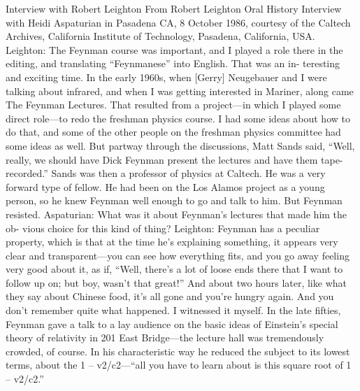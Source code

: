 \documentclass[11pt,oneside]{article}
\begin{document}
Interview with Robert Leighton From Robert Leighton Oral History Interview with Heidi Aspaturian in Pasadena CA, 8 October 1986, courtesy of the Caltech Archives, California Institute of Technology, Pasadena, California, USA. Leighton: The Feynman course was important, and I played a role there in the editing, and translating “Feynmanese” into English. That was an in- teresting and exciting time. In the early 1960s, when [Gerry] Neugebauer and I were talking about infrared, and when I was getting interested in Mariner, along came The Feynman Lectures. That resulted from a project---in which I played some direct role---to redo the freshman physics course. I had some ideas about how to do that, and some of the other people on the freshman physics committee had some ideas as well. But partway through the discussions, Matt Sands said, “Well, really, we should have Dick Feynman present the lectures and have them tape-recorded.” Sands was then a professor of physics at Caltech. He was a very forward type of fellow. He had been on the Los Alamos project as a young person, so he knew Feynman well enough to go and talk to him. But Feynman resisted. Aspaturian: What was it about Feynman’s lectures that made him the ob- vious choice for this kind of thing? Leighton: Feynman has a peculiar property, which is that at the time he’s explaining something, it appears very clear and transparent---you can see how everything fits, and you go away feeling very good about it, as if, “Well, there’s a lot of loose ends there that I want to follow up on; but boy, wasn’t that great!” And about two hours later, like what they say about Chinese food, it’s all gone and you’re hungry again. And you don’t remember quite what happened. I witnessed it myself. In the late fifties, Feynman gave a talk to a lay audience on the basic ideas of Einstein’s special theory of relativity in 201 East Bridge---the lecture hall was tremendously crowded, of course. In his characteristic way he reduced the subject to its lowest terms, about the 1 – v2/c2---“all you have to learn about is this square root of 1 – v2/c2.”\par
\end{document}
